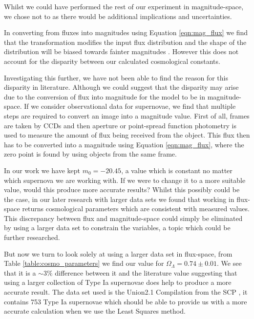 \documentclass[twocolumn]{revtex4}
\begin{document}
Whilst we could have performed the rest of our experiment in magnitude-space, we chose not to as there would be additional implications and uncertainties.

In converting from fluxes into magnitudes using Equation \ref{eqn:mag_flux} we find that the transformation modifies the input flux distribution and the shape of the distribution will be biased towards fainter magnitudes \cite{magspace_stats}. However this does not account for the disparity between our calculated cosmological constants. 

Investigating this further, we have not been able to find the reason for this disparity in literature. Although we could suggest that the disparity may arise due to the conversion of flux into magnitude for the model to be in magnitude-space. If we consider observational data for supernovae, we find that multiple steps are required to convert an image into a magnitude value. First of all, frames are taken by CCDs and then aperture or point-spread function photometry is used to measure the amount of flux being received from the object. This flux then has to be converted into a magnitude using Equation \ref{eqn:mag_flux}, where the zero point is found by using objects from the same frame. 

In our work we have kept $m_0=-20.45$, a value which is constant no matter which supernova we are working with. If we were to change it to a more suitable value, would this produce more accurate results? Whilst this possibly could be the case, in our later research with larger data sets we found that working in flux-space returns cosmological parameters which are consistent with measured values. This discrepancy between flux and magnitude-space could simply be eliminated by using a larger data set to constrain the variables, a topic which could be further researched.

But now we turn to look solely at using a larger data set in flux-space, from Table \ref{table:cosmo_parameters} we find our value for $\Omega_\Lambda=0.74\pm0.01$. We see that it is a $\sim 3\%$ difference between it and the literature value suggesting that using a larger collection of Type Ia supernovae does help to produce a more accurate result. The data set used is the Union2.1 Compilation from the SCP \cite{dataset_2}, it contains 753 Type Ia supernovae which should be able to provide us with a more accurate calculation when we use the Least Squares method. 
\end{document}
